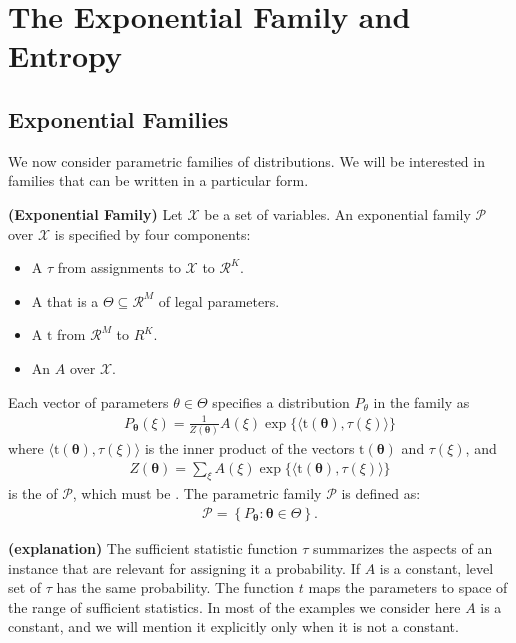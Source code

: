 \documentclass{article}
\newcommand{\bfs}[1]{\textbf{({#1}) }}
\begin{document}
\section{The Exponential Family and Entropy}
\subsection{Exponential Families}
 We now consider parametric  families of distributions. We will be interested in families that can be written in a particular form.
\begin{defa}\bfs{Exponential Family}
Let $\mathcal{X}$ be a set of variables. An exponential family $\mathcal{P}$ over $\mathcal{X}$ is specified by four components:
\begin{itemize}
    \item  A  $\tau$ from assignments to $\mathcal{X}$ to $\mathcal{R}^{K}$.
    \item A  that is a  $\Theta \subseteq \mathcal{R}^{M}$ of legal parameters.
    \item A  $\mathrm{t}$ from $\mathcal{R}^{M}$ to $R^{K}$.
    \item An  $A$ over $\mathcal{X}$.
\end{itemize}
Each vector of parameters $\theta \in \Theta$ specifies a distribution $P_{\theta}$ in the family as
\begin{align*}
P_{\boldsymbol{\theta}}(\xi)=\frac{1}{Z(\boldsymbol{\theta})} A(\xi) \exp \{\langle\mathrm{t}(\boldsymbol{\theta}), \tau(\xi)\rangle\}
\end{align*}
where $\langle\mathrm{t}(\boldsymbol{\theta}), \tau(\xi)\rangle$ is the inner product of the vectors $\mathrm{t}(\boldsymbol{\theta})$ and $\tau(\xi)$, and
\begin{align*}
Z(\boldsymbol{\theta})=\sum_{\xi} A(\xi) \exp \{\langle\mathrm{t}(\boldsymbol{\theta}), \tau(\xi)\rangle\}
\end{align*}
is the  of $\mathcal{P}$, which must be . The parametric family $\mathcal{P}$ is defined as:
\begin{align*}
\mathcal{P}=\left\{P_{\boldsymbol{\theta}}: \boldsymbol{\theta} \in \Theta\right\} .
\end{align*}
\end{defa}
\begin{defa}\bfs{explanation}
The sufficient statistic function $\tau$ summarizes the aspects of an instance that are relevant for assigning it a probability. If $A$ is a constant, level set of $\tau$ has the same probability.  The function $t$ maps the parameters to space of the range of sufficient statistics.  In most of the examples we consider here $A$ is a constant, and we will mention it explicitly only when it is not a constant.
\end{defa}
\end{document}
